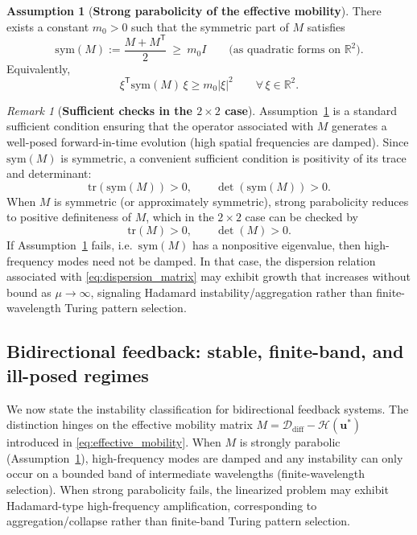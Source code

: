 \documentclass[pdflatex,sn-mathphys-ay]{sn-jnl}
\theoremstyle{thmstyleone}
\theoremstyle{definition}
\newtheorem{assumption}[theorem]{Assumption}
\theoremstyle{remark}
\newtheorem{remark}[theorem]{Remark}
\begin{document}
\begin{assumption}[\textbf{Strong parabolicity of the effective mobility}]
\label{ass:strong_parabolicity}
There exists a constant $m_0>0$ such that the symmetric part of $M$ satisfies
\[
\mathrm{sym}(M):=\frac{M+M^{\mathsf T}}{2}\ \ge\ m_0 I
\qquad\text{(as quadratic forms on }\mathbb{R}^2\text{)}.
\]
Equivalently,
\[
\xi^{\mathsf T}\mathrm{sym}(M)\,\xi \ge m_0|\xi|^2\qquad \forall\,\xi\in\mathbb{R}^2.
\]
\end{assumption}

\begin{remark}[\textbf{Sufficient checks in the $2\times 2$ case}]
\label{rmk:parabolicity_conditions}
Assumption~\ref{ass:strong_parabolicity} is a standard sufficient condition ensuring that the operator associated with $M$ generates a well-posed forward-in-time evolution (high spatial frequencies are damped). 
Since $\mathrm{sym}(M)$ is symmetric, a convenient sufficient condition is positivity of its trace and determinant:
\[
\mathrm{tr}(\mathrm{sym}(M))>0,
\qquad 
\det(\mathrm{sym}(M))>0.
\]
When $M$ is symmetric (or approximately symmetric), strong parabolicity reduces to positive definiteness of $M$, which in the $2\times 2$ case can be checked by
\[
\mathrm{tr}(M)>0,
\qquad 
\det(M)>0.
\]
If Assumption~\ref{ass:strong_parabolicity} fails, i.e.\ $\mathrm{sym}(M)$ has a nonpositive eigenvalue, then high-frequency modes need not be damped. 
In that case, the dispersion relation associated with \eqref{eq:dispersion_matrix} may exhibit growth that increases without bound as $\mu\to\infty$, signaling Hadamard instability/aggregation rather than finite-wavelength Turing pattern selection.
\end{remark}

\subsection{Bidirectional feedback: stable, finite-band, and ill-posed regimes}
\label{subsec:twoway_classification}

We now state the instability classification for bidirectional feedback systems. 
The distinction hinges on the effective mobility matrix $M=\mathcal{D}_{\mathrm{diff}}-\mathcal{H}(\mathbf{u}^*)$ introduced in \eqref{eq:effective_mobility}. 
When $M$ is strongly parabolic (Assumption~\ref{ass:strong_parabolicity}), high-frequency modes are damped and any instability can only occur on a bounded band of intermediate wavelengths (finite-wavelength selection). 
When strong parabolicity fails, the linearized problem may exhibit Hadamard-type high-frequency amplification, corresponding to aggregation/collapse rather than finite-band Turing pattern selection.
\end{document}
